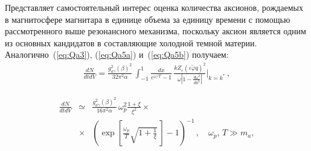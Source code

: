 %
%
%
%
%

Представляет самостоятельный интерес оценка количества аксионов,
рождаемых в магнитосфере магнитара в единице объема за единицу времени с 
помощью рассмотренного выше резонансного
механизма, поскольку аксион является одним из основных кандидатов в составляющие
холодной темной материи. Аналогично~(\ref{eq:Qa3}), (\ref{eq:Qa5a}) 
и~(\ref{eq:Qa5b}) получаем: 
%
\begin{eqnarray}
\frac{dN}{dt dV} =  \frac{g_{a\gamma}^2 (\beta)^2}{32 \pi^2 \alpha} \, 
\int_{-1}^1 \frac{dx}{e^{\omega/T}-1} \, 
\frac{k Z_{\varepsilon} 
(\varepsilon \tilde \varphi q)^2}{\omega 
\left |1-\frac{d\omega^2}{dk^2}\right |}\bigg |_{k=k^*}\, ,
\label{eq:Na0}
\end{eqnarray}
%

%
\begin{eqnarray}
\label{eq:Na1}
\frac{dN}{dt dV} &\simeq&  \frac{g_{a\gamma}^2 (\beta)^2}{16 \pi^2 \alpha} \,
\omega_p^2 \frac{1+\xi}{\xi^{2}}\times
\\
\nonumber 
&\times& \left (\exp{\left [\frac{\omega_p}{T} 
\sqrt{1+\frac{1}{\xi}}\, \right ]}-1 \right )^{-1} \, , \quad \omega_p,\, T \gg m_a,
\end{eqnarray}
%


